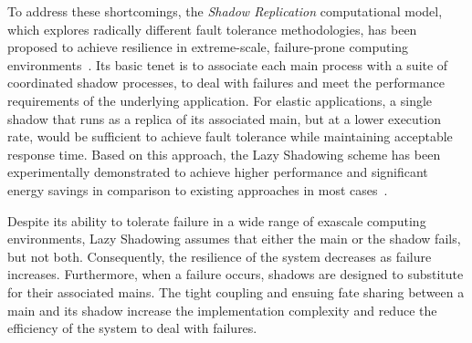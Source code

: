 To address these shortcomings, the {\it Shadow Replication} computational model, which explores radically different fault tolerance methodologies, has been proposed to achieve resilience in extreme-scale, failure-prone computing environments~\cite{mills2014power}. Its basic tenet is to associate each main process with a suite of coordinated shadow processes, %
to deal with failures and meet the performance requirements of the underlying application. 
For elastic applications, %
a single shadow that runs as a replica of its associated main, but at a lower execution rate, would be sufficient to achieve fault tolerance while maintaining acceptable response time. 
Based on this approach, the Lazy Shadowing scheme has been experimentally demonstrated to achieve higher performance and significant energy savings in comparison to existing approaches in most cases~\cite{cui_2016_scalcom}. 

Despite its ability to tolerate failure in a wide range of exascale computing environments, Lazy Shadowing assumes that either the main or the shadow fails, but not both. Consequently, the resilience of the system decreases as failure increases. Furthermore, when a failure occurs, shadows are designed to substitute for their associated mains. The tight coupling and ensuing fate sharing between a main and its shadow increase the implementation complexity and reduce the efficiency of the system to deal with failures. 

